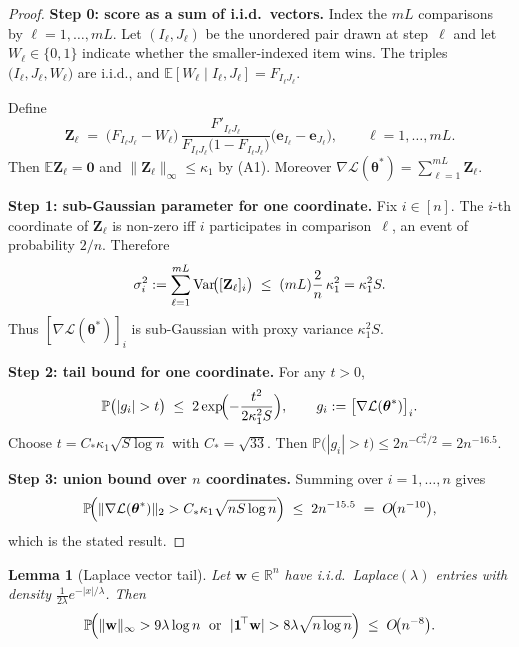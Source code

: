 \documentclass[letterpaper,12pt]{article}
\numberwithin{equation}{section}
\theoremstyle{plain}
\numberwithin{Theorem}{section}
\numberwithin{corollary}{section}
\numberwithin{proposition}{section}
\newtheorem{Lemma}{Lemma}
\numberwithin{Lemma}{section}
{
	\theoremstyle{definition}
	\newtheorem{Definition}{Definition}
	\newtheorem{example}{Example}
	\numberwithin{example}{section}
	\newtheorem{fact}{Fact}
	\numberwithin{fact}{section}
	\newtheorem{remark}{Remark}
}
\newcommand{\Pro}{\mathbb{P}}
\newcommand{\1}{\mathbbm{1}}
\def\bth{{\boldsymbol{\theta}}}
\def\R{{\mathbb R}}
\def\Var{{\rm Var}}
\def\E{\mathbb{E}}
\begin{document}
\begin{proof}
	\textbf{Step 0: score as a sum of i.i.d.\ vectors.}
	Index the $mL$ comparisons by $\ell=1,\dots ,mL$.  Let
	\((I_\ell,J_\ell)\) be the unordered pair drawn at step~$\ell$ and let
	\(W_\ell\in\{0,1\}\) indicate whether the smaller-indexed item wins.
	The triples
	\(\bigl(I_\ell,J_\ell,W_\ell\bigr)\) are i.i.d., and
	\(\E[W_\ell\mid I_\ell,J_\ell]=F_{I_\ell J_\ell}\).
	
	Define
	\[
	\mathbf Z_\ell
	\;=\;
	\bigl(F_{I_\ell J_\ell}-W_\ell\bigr)\,
	\frac{F'_{I_\ell J_\ell}}{F_{I_\ell J_\ell}\bigl(1-F_{I_\ell J_\ell}\bigr)}
	\bigl(\mathbf e_{I_\ell}-\mathbf e_{J_\ell}\bigr),
	\qquad
	\ell=1,\dots,mL .
	\]
	Then \(\E\mathbf Z_\ell=\mathbf 0\) and
	\(\|\mathbf Z_\ell\|_{\infty}\le\kappa_{1}\) by (A1).  Moreover
	\(
	\nabla\mathcal L(\bth^{*})=\sum_{\ell=1}^{mL}\mathbf Z_\ell.
	\)
	
	\medskip
	\noindent
	\textbf{Step 1: sub-Gaussian parameter for one coordinate.}
	Fix \(i\in[n]\).  The $i$-th coordinate of \(\mathbf Z_\ell\) is non-zero
	iff \(i\) participates in comparison~$\ell$, an event of probability
	\(2/n\).  Therefore
	\[
	\sigma_i^{2}
	:=\sum_{\ell=1}^{mL}
	\Var\!\bigl([\mathbf Z_\ell]_{i}\bigr)
	\;\le\;
	(mL)\frac{2}{n}\,\kappa_{1}^{2}
	=\kappa_{1}^{2}S .
	\]
	Thus \([\nabla\mathcal L(\bth^{*})]_{i}\) is sub-Gaussian with
	proxy variance \(\kappa_{1}^{2}S\).
	
	\medskip
	\noindent
	\textbf{Step 2: tail bound for one coordinate.}
	For any \(t>0\),
	\[
	\Pro\bigl(|g_i|>t\bigr)
	\;\le\;
	2\exp\!\Bigl(
	-\frac{t^{2}}{2\kappa_{1}^{2}S}
	\Bigr),
	\qquad
	g_i:=\bigl[\nabla\mathcal L(\bth^{*})\bigr]_i .
	\]
	Choose \(t=C_{*}\kappa_{1}\sqrt{S\log n}\) with
	\(C_{*}=\sqrt{33}\).
	Then
	\(\Pro\bigl(|g_i|>t\bigr)\le 2n^{-C_{*}^{2}/2}=2n^{-16.5}\).
	
	\medskip
	\noindent
	\textbf{Step 3: union bound over $n$ coordinates.}
	Summing over \(i=1,\dots,n\) gives
	\[
	\Pro\!\Bigl(
	\|\nabla\mathcal L(\bth^{*})\|_{2}
	> C_{*}\kappa_{1}\sqrt{nS\log n}
	\Bigr)
	\;\le\;
	2n^{-15.5}
	\;=\;
	O\!\bigl(n^{-10}\bigr),
	\]
	which is the stated result.
\end{proof}

\begin{Lemma}[Laplace vector tail]
	\label{lem:Laplace}
	Let $\mathbf w\in\R^{n}$ have i.i.d.\ Laplace$(\lambda)$ entries with
	density $\tfrac1{2\lambda}e^{-|x|/\lambda}$.
	Then
	\[
	\Pro\!\Bigl(
	\|\mathbf w\|_{\infty}>9\lambda\log n
	\;\text{ or }\;
	|\mathbf1^{\!\top}\mathbf w|>8\lambda\sqrt{n\log n}
	\Bigr)
	\;\le\;O\!\bigl(n^{-8}\bigr).
	\]
\end{Lemma}
\end{document}
